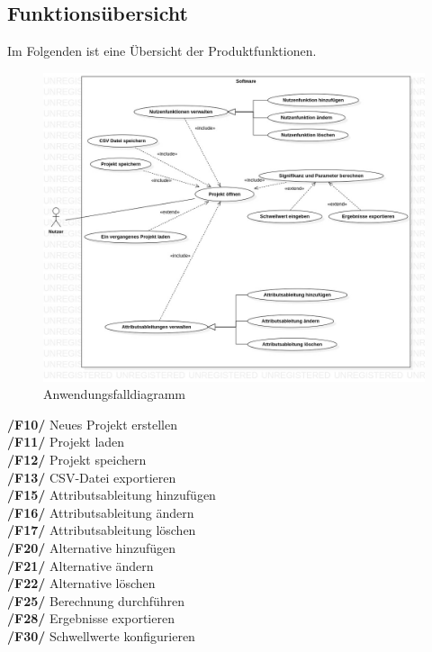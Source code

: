 \documentclass{article}
\begin{document}
\subsection{Funktionsübersicht}
Im Folgenden ist eine Übersicht der Produktfunktionen.
\begin{figure}[H]%
  \centering
  \includegraphics[width=15cm]{specifications/img/use-case/UseCaseDiagram6.jpg}
  \caption{Anwendungsfalldiagramm}
\end{figure} 
\newpage
\textbf{/F10/} Neues Projekt erstellen \\
\textbf{/F11/} Projekt laden \\
\textbf{/F12/} Projekt speichern \\
\textbf{/F13/} CSV-Datei exportieren \\
\textbf{/F15/} Attributsableitung hinzufügen \\
\textbf{/F16/} Attributsableitung ändern \\
\textbf{/F17/} Attributsableitung löschen \\
\textbf{/F20/} Alternative hinzufügen \\
\textbf{/F21/} Alternative ändern \\
\textbf{/F22/} Alternative löschen \\
\textbf{/F25/} Berechnung durchführen \\
\textbf{/F28/} Ergebnisse exportieren \\
\textbf{/F30/} Schwellwerte konfigurieren
\\[0.5in]
\end{document}
